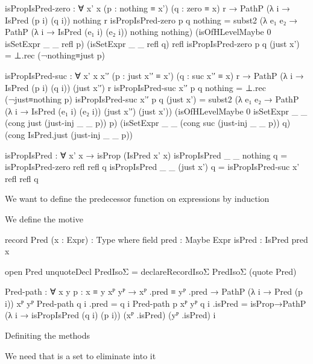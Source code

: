 \begin{code}[hide]
  isPropIsPred-zero :
    ∀ {x' x} (p : nothing ≡ x') (q : zero ≡ x) r →
    PathP (λ i → IsPred (p i) (q i)) nothing r
  isPropIsPred-zero p q nothing =
    subst2 (λ e₁ e₂ → PathP (λ i → IsPred (e₁ i) (e₂ i)) nothing nothing)
      (isOfHLevelMaybe 0 isSetExpr _ _ refl p)
      (isSetExpr _ _ refl q)
      refl
  isPropIsPred-zero p q (just x') = ⊥.rec (¬nothing≡just p)

  isPropIsPred-suc :
    ∀ {x' x} x'′ (p : just x'′ ≡ x') (q : suc x'′ ≡ x) r →
    PathP (λ i → IsPred (p i) (q i)) (just x'′) r
  isPropIsPred-suc x'′ p q nothing = ⊥.rec (¬just≡nothing p)
  isPropIsPred-suc x'′ p q (just x') =
    subst2 (λ e₁ e₂ → PathP (λ i → IsPred (e₁ i) (e₂ i)) (just x'′) (just x'))
      (isOfHLevelMaybe 0 isSetExpr _ _ (cong just (just-inj _ _ p)) p)
      (isSetExpr _ _ (cong suc (just-inj _ _ p)) q)
      (cong IsPred.just (just-inj _ _ p))

  isPropIsPred : ∀ x' x → isProp (IsPred x' x)
  isPropIsPred _ _ nothing q = isPropIsPred-zero refl refl q
  isPropIsPred _ _ (just x') q = isPropIsPred-suc x' refl refl q
\end{code}
We want to define the predecessor function on expressions by induction

We define the motive
\begin{code}
  record Pred (x : Expr) : Type where
    field
      pred : Maybe Expr
      isPred : IsPred pred x
\end{code}
\begin{code}[hide]
  open Pred
  unquoteDecl PredIsoΣ = declareRecordIsoΣ PredIsoΣ (quote Pred)

  Pred-path :
    ∀ {x y} {p : x ≡ y} {xᴾ yᴾ} →
    xᴾ .pred ≡ yᴾ .pred → PathP (λ i → Pred (p i)) xᴾ yᴾ
  Pred-path q i .pred = q i
  Pred-path {p} {xᴾ} {yᴾ} q i .isPred =
    isProp→PathP (λ i → isPropIsPred (q i) (p i)) (xᴾ .isPred) (yᴾ .isPred) i
\end{code}
Definiting the methods

We need that  is a set to eliminate into it

